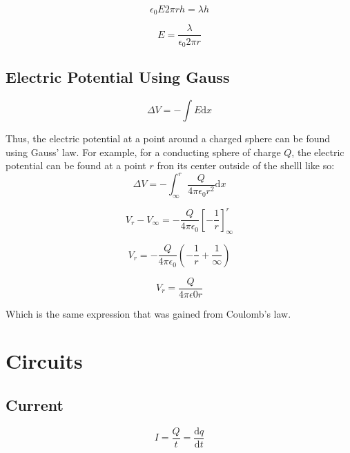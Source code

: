 \documentclass[a4paper,12pt]{article}
\begin{document}
					\begin{equation*}
							\epsilon_{0} E 2 \pi r h = \lambda h 
					\end{equation*}

					\begin{equation*}
							E = \frac{\lambda}{\epsilon_{0} 2 \pi r}
					\end{equation*}
				
				\subsection{Electric Potential Using Gauss}
					\begin{equation*}
							\Delta V = -\int E \mathrm{d}x 
					\end{equation*}

						Thus, the electric potential at a point around a charged sphere can be found using Gauss' law. For example, for a conducting sphere of charge $Q$, the electric potential can be found at a point  $r$ fron its center outside of the shelll like so:							
						\begin{equation*}
								\Delta V =-\int_{\infty}^{r} \frac{Q}{4 \pi \epsilon_{0} r^{2}} \mathrm{d}x
						\end{equation*}

						\begin{equation*}
								V_{r} - V_{\infty} = -\frac{Q}{4 \pi \epsilon_{0}}\left[-\frac{1}{r}\right]_{\infty}^{r}
						\end{equation*}

						\begin{equation*}
								V_{r} = -\frac{Q}{4\pi \epsilon_{0}} \left(-\frac{1}{r} + \frac{1}{\infty}\right)
						\end{equation*}

						\begin{equation*}
								V_{r} = \frac{Q}{4\pi \epsilon{0} r}
						\end{equation*}

						Which is the same expression that was gained from Coulomb's law.
				\setcounter{subsubsection}{0}
			\setcounter{subsection}{0}
		\section{Circuits}
			\subsection{Current}
				\begin{equation*}
						I = \frac{Q}{t} = \frac{\mathrm{d}q}{\mathrm{d}t}
				\end{equation*}
\end{document}
